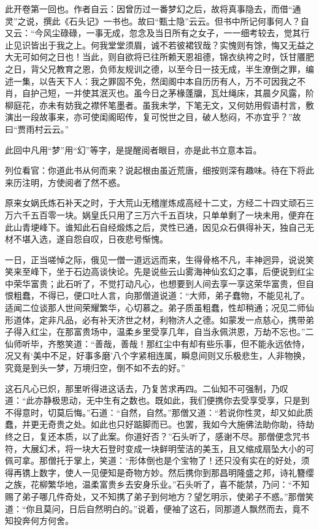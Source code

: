 此开卷第一回也。作者自云：因曾历过一番梦幻之后，故将真事隐去，而借“通灵”之说，撰此《石头记》一书也。故曰“甄士隐”云云。但书中所记何事何人？自又云：“今风尘碌碌，一事无成，忽念及当日所有之女子，一一细考较去，觉其行止见识皆出于我之上。何我堂堂须眉，诚不若彼裙钗哉？实愧则有馀，悔又无益之大无可如何之日也！当此，则自欲将已往所赖天恩祖德，锦衣纨袴之时，饫甘餍肥之日，背父兄教育之恩，负师友规训之德，以至今日一技无成，半生潦倒之罪，编述一集，以告天下人：我之罪固不免，然闺阁中本自历历有人，万不可因我之不肖，自护己短，一并使其泯灭也。虽今日之茅椽蓬牖，瓦灶绳床，其晨夕风露，阶柳庭花，亦未有妨我之襟怀笔墨者。虽我未学，下笔无文，又何妨用假语村言，敷演出一段故事来，亦可使闺阁昭传，复可悦世之目，破人愁闷，不亦宜乎？”故曰“贾雨村云云。”

此回中凡用“梦”用“幻”等字，是提醒阅者眼目，亦是此书立意本旨。

列位看官：你道此书从何而来？说起根由虽近荒唐，细按则深有趣味。待在下将此来历注明，方使阅者了然不惑。

原来女娲氏炼石补天之时，于大荒山无稽崖炼成高经十二丈，方经二十四丈顽石三万六千五百零一块。娲皇氏只用了三万六千五百块，只单单剩了一块未用，便弃在此山青埂峰下。谁知此石自经煅炼之后，灵性已通，因见众石俱得补天，独自己无材不堪入选，遂自怨自叹，日夜悲号惭愧。

一日，正当嗟悼之际，俄见一僧一道远远而来，生得骨格不凡，丰神迥异，说说笑笑来至峰下，坐于石边高谈快论。先是说些云山雾海神仙玄幻之事，后便说到红尘中荣华富贵；此石听了，不觉打动凡心，也想要到人间去享一享这荣华富贵，但自恨粗蠢，不得已，便口吐人言，向那僧道说道：“大师，弟子蠢物，不能见礼了。适闻二位谈那人世间荣耀繁华，心切慕之。弟子质虽粗蠢，性却稍通；况见二师仙形道体，定非凡品，必有补天济世之材，利物济人之德。如蒙发一点慈心，携带弟子得入红尘，在那富贵场中，温柔乡里受享几年，自当永佩洪恩，万劫不忘也。”二仙师听毕，齐憨笑道：“善哉，善哉！那红尘中有却有些乐事，但不能永远依恃，况又有‘美中不足，好事多磨’八个字紧相连属，瞬息间则又乐极悲生，人非物换，究竟是到头一梦，万境归空，倒不如不去的好。”

这石凡心已炽，那里听得进这话去，乃复苦求再四。二仙知不可强制，乃叹道：“此亦静极思动，无中生有之数也。既如此，我们便携你去受享受享，只是到不得意时，切莫后悔。”石道：“自然，自然。”那僧又道：“若说你性灵，却又如此质蠢，并更无奇贵之处。如此也只好踮脚而已。也罢，我如今大施佛法助你助，待劫终之日，复还本质，以了此案。你道好否？”石头听了，感谢不尽。那僧便念咒书符，大展幻术，将一块大石登时变成一块鲜明莹洁的美玉，且又缩成扇坠大小的可佩可拿。那僧托于掌上，笑道：“形体倒也是个宝物了！还只没有实在的好处，须得再镌上数字，使人一见便知是奇物方妙。然后携你到那昌明隆盛之邦，诗礼簪缨之族，花柳繁华地，温柔富贵乡去安身乐业。”石头听了，喜不能禁，乃问：“不知赐了弟子哪几件奇处，又不知携了弟子到何地方？望乞明示，使弟子不惑。”那僧笑道：“你且莫问，日后自然明白的。”说着，便袖了这石，同那道人飘然而去，竟不知投奔何方何舍。

